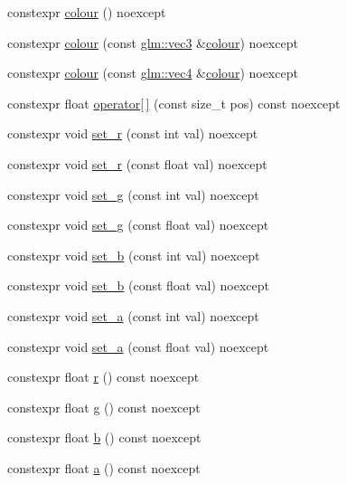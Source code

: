 \begin{DoxyCompactItemize}
\item 
constexpr \mbox{\hyperlink{classmoka_1_1colour_ad09262ca992f6ce84ea945b5efedffe0}{colour}} () noexcept
\item 
constexpr \mbox{\hyperlink{classmoka_1_1colour_ad01b6d1af210de8289c0add5a3d1be04}{colour}} (const \mbox{\hyperlink{namespacemoka_aed2224bc0e5b79e57a8975ded94ee1aaa97ade28e93c0de60adc075bdbe07ca36}{glm\+::vec3}} \&\mbox{\hyperlink{classmoka_1_1colour}{colour}}) noexcept
\item 
constexpr \mbox{\hyperlink{classmoka_1_1colour_aadf7f1fda733557fd18fac24081b75e5}{colour}} (const \mbox{\hyperlink{namespacemoka_aed2224bc0e5b79e57a8975ded94ee1aaa1a9028fd802c481a99491a418ca2fe86}{glm\+::vec4}} \&\mbox{\hyperlink{classmoka_1_1colour}{colour}}) noexcept
\item 
constexpr float \mbox{\hyperlink{classmoka_1_1colour_ae28feff4fd8815b6612ef4cf16b026b8}{operator\mbox{[}$\,$\mbox{]}}} (const size\+\_\+t pos) const noexcept
\item 
constexpr void \mbox{\hyperlink{classmoka_1_1colour_acf6a295464965ba7da438056c3b93986}{set\+\_\+r}} (const int val) noexcept
\item 
constexpr void \mbox{\hyperlink{classmoka_1_1colour_a5c03d583bf2b0d33e46b9c17defab90d}{set\+\_\+r}} (const float val) noexcept
\item 
constexpr void \mbox{\hyperlink{classmoka_1_1colour_ad5e756d118fe5d7fddca8fba8d826b0a}{set\+\_\+g}} (const int val) noexcept
\item 
constexpr void \mbox{\hyperlink{classmoka_1_1colour_af0e845db8ecc3a17e371fb3f9523273f}{set\+\_\+g}} (const float val) noexcept
\item 
constexpr void \mbox{\hyperlink{classmoka_1_1colour_a7cf8baff4073bf0ad69103cd663d6972}{set\+\_\+b}} (const int val) noexcept
\item 
constexpr void \mbox{\hyperlink{classmoka_1_1colour_a60b29bebff89e6507b5af40d8cc8ffb5}{set\+\_\+b}} (const float val) noexcept
\item 
constexpr void \mbox{\hyperlink{classmoka_1_1colour_a700d904dd083ebbbc73b1aee6645d58c}{set\+\_\+a}} (const int val) noexcept
\item 
constexpr void \mbox{\hyperlink{classmoka_1_1colour_ac4ff9c1b4848a555ec4e6c6d471a2209}{set\+\_\+a}} (const float val) noexcept
\item 
constexpr float \mbox{\hyperlink{classmoka_1_1colour_a2ec71fd89ba133142c84c3a7a0ce35eb}{r}} () const noexcept
\item 
constexpr float \mbox{\hyperlink{classmoka_1_1colour_a884fe789032a1e3a1d40c55f5cf852bd}{g}} () const noexcept
\item 
constexpr float \mbox{\hyperlink{classmoka_1_1colour_a091a6fe2b9364663da19e7b561739411}{b}} () const noexcept
\item 
constexpr float \mbox{\hyperlink{classmoka_1_1colour_ac2a9d008b8201e9e2b3518f3e1d2de7e}{a}} () const noexcept
\end{DoxyCompactItemize}
